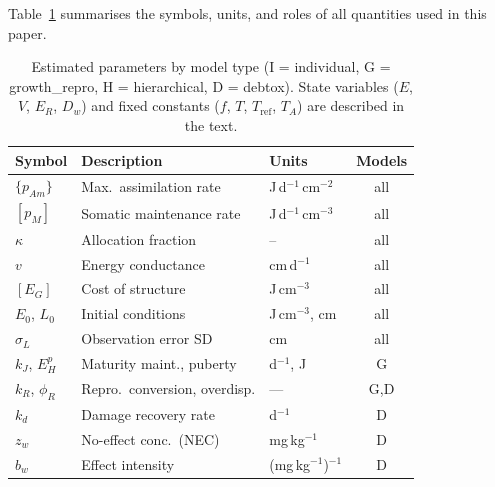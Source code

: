 \documentclass[article,shortnames]{jss}
\newcommand{\pAm}{\{p_{Am}\}}
\newcommand{\pM}{[p_M]}
\newcommand{\EG}{[E_G]}
\begin{document}
Table~\ref{tab:notation} summarises the symbols, units, and roles of
all quantities used in this paper.

\begin{table}[t!]
\centering
\caption{Estimated parameters by model type (I = individual,
  G = growth\_repro, H = hierarchical, D = debtox).
  State variables ($E$, $V$, $E_R$, $D_w$) and fixed constants
  ($f$, $T$, $T_{\mathrm{ref}}$, $T_A$) are described in the text.}
\label{tab:notation}
\small
\begin{tabular}{lllc}
\toprule
Symbol & Description & Units & Models \\
\midrule
$\pAm$   & Max.\ assimilation rate   & J\,d$^{-1}$\,cm$^{-2}$ & all \\
$\pM$    & Somatic maintenance rate  & J\,d$^{-1}$\,cm$^{-3}$ & all \\
$\kappa$ & Allocation fraction       & --              & all \\
$v$      & Energy conductance        & cm\,d$^{-1}$   & all \\
$\EG$    & Cost of structure         & J\,cm$^{-3}$   & all \\
$E_0$, $L_0$ & Initial conditions   & J\,cm$^{-3}$, cm & all \\
$\sigma_L$ & Observation error SD   & cm              & all \\
$k_J$, $E_H^p$ & Maturity maint., puberty & d$^{-1}$, J & G \\
$k_R$, $\phi_R$ & Repro.\ conversion, overdisp. & --- & G,D \\
$k_d$    & Damage recovery rate      & d$^{-1}$       & D \\
$z_w$    & No-effect conc.\ (NEC)    & mg\,kg$^{-1}$  & D \\
$b_w$    & Effect intensity       & (mg\,kg$^{-1}$)$^{-1}$ & D \\
\bottomrule
\end{tabular}
\end{table}
\end{document}
